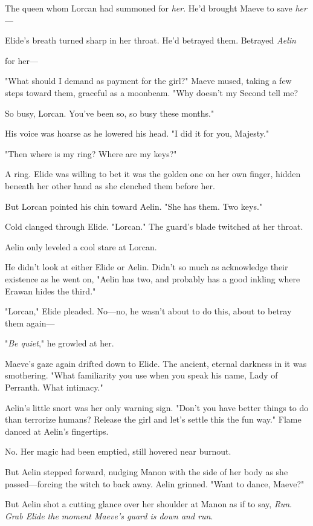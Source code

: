 The queen whom Lorcan had summoned for \emph{her}. He'd brought Maeve to save \emph{her}---

Elide's breath turned sharp in her throat. He'd betrayed them. Betrayed
\emph{Aelin}

for her---

"What should I demand as payment for the girl?" Maeve mused, taking a few steps toward them, graceful as a moonbeam. "Why doesn't my Second tell me?

So busy, Lorcan. You've been so, so busy these months."

His voice was hoarse as he lowered his head. "I did it for you, Majesty."

"Then where is my ring? Where are my keys?"

A ring. Elide was willing to bet it was the golden one on her own finger, hidden beneath her other hand as she clenched them before her.

But Lorcan pointed his chin toward Aelin. "She has them. Two keys."

Cold clanged through Elide. "Lorcan." The guard's blade twitched at her throat.

Aelin only leveled a cool stare at Lorcan.

He didn't look at either Elide or Aelin. Didn't so much as acknowledge their existence as he went on, "Aelin has two, and probably has a good inkling where Erawan hides the third."

"Lorcan," Elide pleaded. No---no, he wasn't about to do this, about to betray them again---

"\emph{Be quiet}," he growled at her.

Maeve's gaze again drifted down to Elide. The ancient, eternal darkness in it was smothering. "What familiarity you use when you speak his name, Lady of Perranth. What intimacy."

Aelin's little snort was her only warning sign. "Don't you have better things to do than terrorize humans? Release the girl and let's settle this the fun way." Flame danced at Aelin's fingertips.

No. Her magic had been emptied, still hovered near burnout.

But Aelin stepped forward, nudging Manon with the side of her body as she passed---forcing the witch to back away. Aelin grinned. "Want to dance, Maeve?"

But Aelin shot a cutting glance over her shoulder at Manon as if to say,
\emph{Run}. \emph{Grab Elide the moment Maeve's guard is down and run}.

